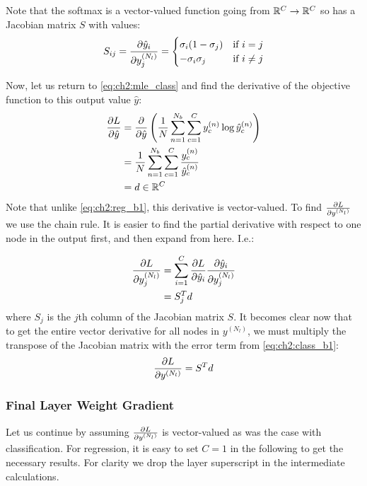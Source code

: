 Note that the softmax is a vector-valued function going from $\reals[C] \rightarrow
\reals[C]$ so has a Jacobian matrix $S$ with values:
\begin{equation}
  S_{ij} = \dydx{\hat{y}_i}{y^{(N_l)}_j} = \begin{cases}
    \sigma_i (1-\sigma_j) & \text{if $i=j$}\\
    -\sigma_i \sigma_j & \text{if $i\neq j$}\\
  \end{cases}
\end{equation}

Now, let us return to \eqref{eq:ch2:mle_class} and find the derivative of the
objective function to this output value $\hat{y}$:
\begin{align}
  \dydx{L}{\hat{y}} &=  \dydx{}{\hat{y}} \left( \frac{1}{N}\sum_{n=1}^{N_b} \sum_{c=1}^C
  y^{(n)}_c \log \hat{y}^{(n)}_c \right) \\
  &= \frac{1}{N}\sum_{n=1}^{N_b} \sum_{c=1}^C \frac{y^{(n)}_c}{\hat{y}^{(n)}_c} \\
  &= d \in \reals[C] \label{eq:ch2:class_b1}
\end{align}
Note that unlike \eqref{eq:ch2:reg_b1}, this derivative is vector-valued. To
find $\dydx{L}{y^{(N_l)}}$ we use the chain rule. It is easier to find the
partial derivative with respect to one node in the output first, and then expand
from here. I.e.:

\begin{align}
  \dydx{L}{y^{(N_l)}_j} &= \sum_{i=1}^C \dydx{L}{\hat{y}_i}\dydx{\hat{y}_i}{y^{(N_l)}_j} \\
                      &= S_j^T d
\end{align}
where $S_j$ is the $j$th column of the Jacobian matrix $S$. It becomes clear now
that to get the entire vector derivative for all nodes in $y^{(N_l)}$, we must
multiply the transpose of the Jacobian matrix with the error term from
\eqref{eq:ch2:class_b1}:
\begin{equation}
  \dydx{L}{y^{(N_l)}} = S^T d
\end{equation}

\subsubsection{Final Layer Weight Gradient} \label{sec:ch2:weight}
Let us continue by assuming $\dydx{L}{y^{(N_l)}}$ is vector-valued as was the case
with classification. For regression, it is easy to set $C=1$ in the following to
get the necessary results. For clarity we drop the layer
superscript in the intermediate calculations.


